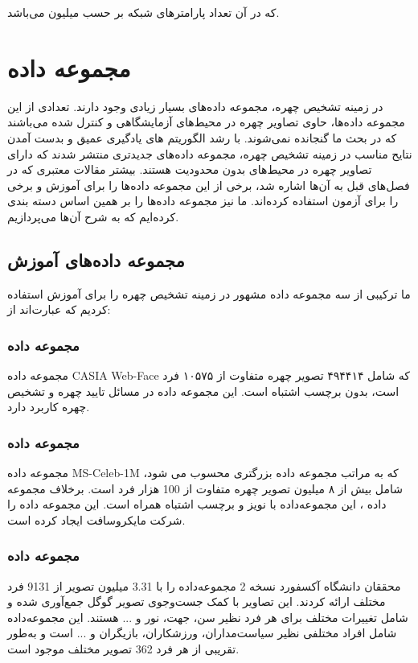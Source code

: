 \noindent
که در آن  تعداد پارامترهای شبکه بر حسب میلیون می‌باشد.

\section{مجموعه داده}
در زمینه تشخیص چهره، مجموعه داده‌های بسیار زیادی وجود دارند. تعدادی از این مجموعه داده‌ها، حاوی تصاویر چهره در محیط‌های آزمایشگاهی و کنترل شده می‌باشند که در بحث ما گنجانده نمی‌شوند. با رشد الگوریتم های یادگیری عمیق و بدست آمدن نتایح مناسب در زمینه تشخیص چهره، مجموعه داده‌های جدیدتری منتشر شدند که دارای تصاویر چهره در محیط‌های بدون محدودیت هستند. بیشتر مقالات معتبری که در فصل‌های قبل به آن‌ها اشاره شد، برخی از این مجموعه داده‌ها را برای آموزش و برخی را برای آزمون استفاده کرده‌اند. ما نیز مجموعه داده‌ها را بر همین اساس دسته بندی کرده‌ایم که به شرح آن‌ها می‌پردازیم.

\subsection{مجموعه داده‌های آموزش}
ما ترکیبی از سه مجموعه داده مشهور در زمینه تشخیص چهره را برای آموزش استفاده کردیم که عبارت‌اند از:
\subsubsection{مجموعه داده }
مجموعه داده CASIA Web-Face که شامل ۴۹۴۴۱۴ تصویر چهره متفاوت از ۱۰۵۷۵ فرد است، بدون برچسب اشتباه است. این مجموعه داده در مسائل تایید چهره و تشخیص چهره کاربرد دارد. \cite{CASIA_dataset}

\subsubsection{مجموعه داده }
مجموعه داده MS-Celeb-1M  که به مراتب مجموعه داده بزرگتری محسوب می شود، شامل بیش از ۸ میلیون تصویر چهره متفاوت از 100 هزار فرد است. برخلاف مجموعه داده ، این مجموعه‌داده با نویز و برچسب اشتباه همراه است. این مجموعه داده را شرکت مایکروسافت ایجاد کرده است. \cite{MS_Celeb_dataset}

\subsubsection{مجموعه داده }
محققان دانشگاه آکسفورد نسخه 2 مجموعه‌داده‌  را با 3.31 میلیون تصویر از 9131 فرد مختلف ارائه کردند. این تصاویر با کمک جست‌و‌جوی تصویر گوگل جمع‌آوری ‌شده و شامل تغییرات مختلف برای هر فرد نظیر سن، جهت، نور و ... هستند. این مجموعه‌داده شامل افراد مختلفی نظیر سیاست‌مداران، ورزشکاران، بازیگران و ... است و به‌طور تقریبی از هر فرد 362 تصویر مختلف موجود است. \cite{VGGFace2_dataset}

